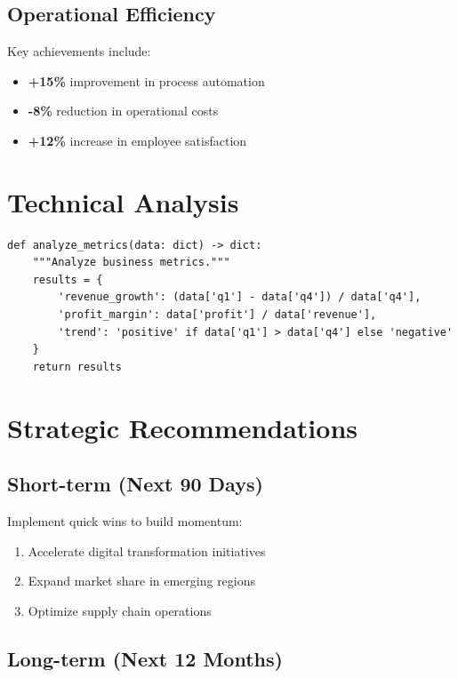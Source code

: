 \documentclass[11pt]{article}
\begin{document}
\subsection{Operational Efficiency}

Key achievements include:
\begin{itemize}
    \item \textcolor{AcmeRed}{\textbf{+15\%}} improvement in process automation
    \item \textcolor{AcmeRed}{\textbf{-8\%}} reduction in operational costs
    \item \textcolor{AcmeRed}{\textbf{+12\%}} increase in employee satisfaction
\end{itemize}

\section{Technical Analysis}

\begin{lstlisting}[style=pythonstyle, caption=Performance Analysis Code]
def analyze_metrics(data: dict) -> dict:
    """Analyze business metrics."""
    results = {
        'revenue_growth': (data['q1'] - data['q4']) / data['q4'],
        'profit_margin': data['profit'] / data['revenue'],
        'trend': 'positive' if data['q1'] > data['q4'] else 'negative'
    }
    return results
\end{lstlisting}

\section{Strategic Recommendations}

\subsection{Short-term (Next 90 Days)}

Implement quick wins to build momentum:
\begin{enumerate}
    \item Accelerate digital transformation initiatives
    \item Expand market share in emerging regions
    \item Optimize supply chain operations
\end{enumerate}

\subsection{Long-term (Next 12 Months)}
\end{document}
